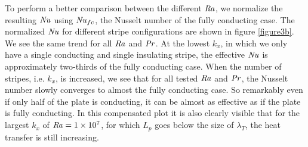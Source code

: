 \documentclass{jfm}
\newcommand\Pran{\mbox{\textit{Pr}}} %
\newcommand\Ray{\mbox{\textit{Ra}}}  %
\newcommand\Nus{\mbox{\textit{Nu}}}  %
\begin{document}
To perform a better comparison between the different $\Ray$, we normalize the
resulting $\Nus$ using $\Nus_{fc}$, the Nusselt number of the fully conducting
case.  The normalized $\Nus$ for different stripe configurations are shown in
figure \ref{figure3b}.  We see the same trend for all $\Ray$ and $\Pran$.  At
the lowest $k_x$, in which we only have a single conducting and single
insulating stripe, the effective $\Nus$ is approximately two-thirds of the
fully conducting case.  When the number of stripes, i.e. $k_x$, is increased,
we see that for all tested $\Ray$ and $\Pran$, the Nusselt number slowly
converges to almost the fully conducting case.  So remarkably even if only
half of the plate is conducting, it can be almost as effective as if the plate
is fully conducting.  In this compensated plot it is also clearly visible that
for the largest $k_x$ of $\Ray=\num{1e7}$, for which $L_p$ goes below the size
of $\lambda_T$, the heat transfer is still increasing.

%
%
\end{document}
